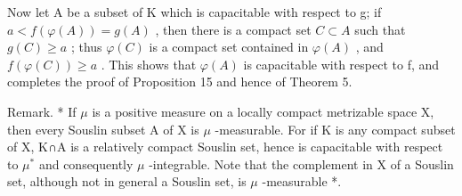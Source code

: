 Now let A be a subset of K which is capacitable with respect to g; if \(a < f(\varphi(A)) = g(A)\) , then there is a compact set \(C \subset A\) such that \(g(C) \geqslant a\) ; thus \(\varphi(C)\) is a compact set contained in \(\varphi(A)\) , and \(f(\varphi(C)) \geqslant a\) . This shows that \(\varphi(A)\) is capacitable with respect to f, and completes the proof of Proposition 15 and hence of Theorem 5.

Remark. * If \(\mu\) is a positive measure on a locally compact metrizable space X, then every Souslin subset A of X is \(\mu\) -measurable. For if K is any compact subset of X, K∩A is a relatively compact Souslin set, hence is capacitable with respect to \(\mu^{*}\) and consequently \(\mu\) -integrable. Note that the complement in X of a Souslin set, although not in general a Souslin set, is \(\mu\) -measurable *.

\appendix
\setcounter{chapter}{9}
\renewcommand{\thechapter}{\Roman{chapter}}
\setcounter{subsection}{0}
\renewcommand{\thesubsection}{\arabic{subsection}}

